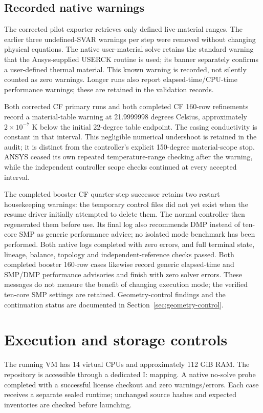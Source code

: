 \documentclass[oneside,openany]{amsdtx}
\begin{document}
\subsection{Recorded native warnings}
The corrected pilot exporter retrieves only defined live-material ranges. The earlier three undefined-SVAR warnings per step were removed without changing physical equations. The native user-material solve retains the standard warning that the Ansys-supplied USERCK routine is used; its banner separately confirms a user-defined thermal material. This known warning is recorded, not silently counted as zero warnings. Longer runs also report elapsed-time/CPU-time performance warnings; these are retained in the validation records.

Both corrected CF primary runs and both completed CF 160-row refinements record a material-table warning at 21.9999998 degrees Celsius, approximately $2\times10^{-7}$ K below the initial 22-degree table endpoint. The casing conductivity is constant in that interval. This negligible numerical undershoot is retained in the audit; it is distinct from the controller's explicit 150-degree material-scope stop. ANSYS ceased its own repeated temperature-range checking after the warning, while the independent controller scope checks continued at every accepted interval.

The completed booster CF quarter-step successor retains two restart housekeeping warnings: the temporary control files did not yet exist when the resume driver initially attempted to delete them. The normal controller then regenerated them before use. Its final log also recommends DMP instead of ten-core SMP as generic performance advice; no isolated mode benchmark has been performed. Both native logs completed with zero errors, and full terminal state, lineage, balance, topology and independent-reference checks passed. Both completed booster 160-row cases likewise record generic elapsed-time and SMP/DMP performance advisories and finish with zero solver errors. These messages do not measure the benefit of changing execution mode; the verified ten-core SMP settings are retained. Geometry-control findings and the continuation status are documented in Section~\ref{sec:geometry-control}.

\section{Execution and storage controls}
The running VM has 14 virtual CPUs and approximately 112 GiB RAM. The repository is accessible through a dedicated I: mapping. A native no-solve probe completed with a successful license checkout and zero warnings/errors. Each case receives a separate sealed runtime; unchanged source hashes and expected inventories are checked before launching.
\end{document}
